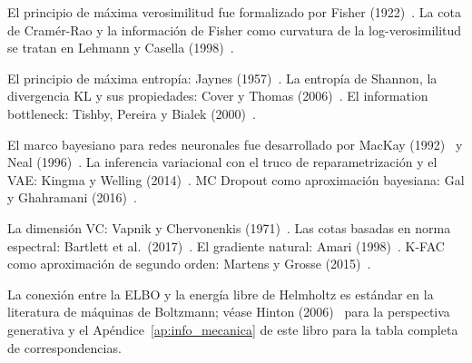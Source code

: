 \begin{notasbib}
El principio de máxima verosimilitud fue formalizado por Fisher
(1922)~\cite{fisher1922mathematical}. La cota de Cramér-Rao y la
información de Fisher como curvatura de la log-verosimilitud se tratan en
Lehmann y Casella (1998)~\cite{lehmann1998theory}.

El principio de máxima entropía: Jaynes
(1957)~\cite{jaynes1957information}. La entropía de Shannon, la
divergencia KL y sus propiedades: Cover y Thomas
(2006)~\cite{cover2006elements}. El information bottleneck: Tishby,
Pereira y Bialek (2000)~\cite{tishby2000information}.

El marco bayesiano para redes neuronales fue desarrollado por MacKay
(1992)~\cite{mackay1992practical} y Neal
(1996)~\cite{neal1996bayesian}. La inferencia variacional con el
truco de reparametrización y el VAE: Kingma y Welling
(2014)~\cite{kingma2013auto}. MC Dropout como aproximación bayesiana:
Gal y Ghahramani (2016)~\cite{gal2016dropout}.

La dimensión VC: Vapnik y Chervonenkis
(1971)~\cite{vapnik1971uniform}. Las cotas basadas en norma espectral:
Bartlett et al.\ (2017)~\cite{bartlett2017spectrally}. El gradiente
natural: Amari (1998)~\cite{amari1998natural}. K-FAC como aproximación
de segundo orden: Martens y Grosse
(2015)~\cite{martens2015optimizing}.

La conexión entre la ELBO y la energía libre de Helmholtz es estándar
en la literatura de máquinas de Boltzmann; véase Hinton
(2006)~\cite{hinton2006fast} para la perspectiva generativa y el
Apéndice~\ref{ap:info_mecanica} de este libro para la tabla completa de
correspondencias.
\end{notasbib}


